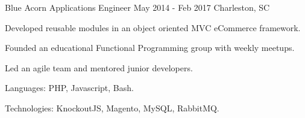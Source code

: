 \begin{cventries}

  \cventry
    {Blue Acorn} %
    {Applications Engineer} %
    {May 2014 - Feb 2017} %
    {Charleston, SC} %
    {
      \begin{cvitems} %
        \item {Developed reusable modules in an object oriented MVC eCommerce framework.}
        \item {Founded an educational Functional Programming group with weekly meetups.}
        \item {Led an agile team and mentored junior developers.}
        \item {Languages: PHP, Javascript, Bash.}
        \item Technologies: KnockoutJS, Magento, MySQL, RabbitMQ.
      \end{cvitems}
    }

\end{cventries}
